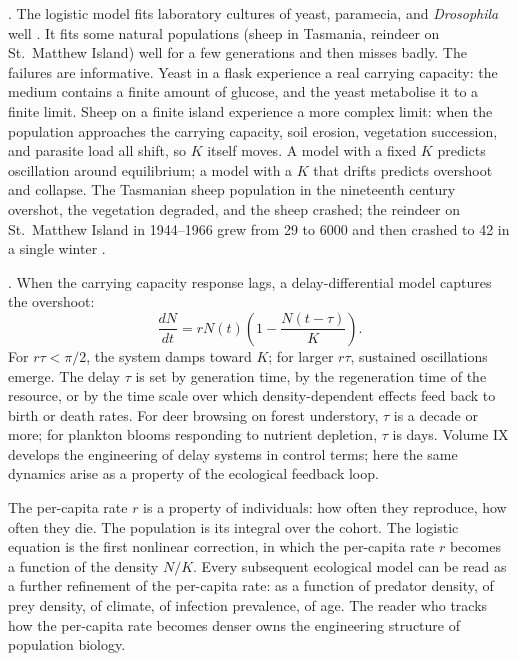 

. The logistic model fits
laboratory cultures of yeast, paramecia, and \emph{Drosophila} well
\cite[ch.~3]{text:v6c08-gotelli-ecology}. It fits some natural
populations (sheep in Tasmania, reindeer on St.\ Matthew Island) well
for a few generations and then misses badly. The failures are
informative. Yeast in a flask experience a real carrying capacity:
the medium contains a finite amount of glucose, and the yeast
metabolise it to a finite limit. Sheep on a finite island experience
a more complex limit: when the population approaches the carrying
capacity, soil erosion, vegetation succession, and parasite load all
shift, so $K$ itself moves. A model with a fixed $K$ predicts
oscillation around equilibrium; a model with a $K$ that drifts
predicts overshoot and collapse. The Tasmanian sheep population in
the nineteenth century overshot, the vegetation degraded, and the
sheep crashed; the reindeer on St.\ Matthew Island in 1944--1966 grew
from 29 to 6000 and then crashed to 42 in a single winter
\cite[pp.~350--367]{paper:v6c08-klein-1968-reindeer}.

. When the carrying capacity response
lags, a delay-differential model captures the overshoot:
\[
\frac{dN}{dt} = r N(t) \left(1 - \frac{N(t - \tau)}{K}\right).
\]
For $r \tau < \pi/2$, the system damps toward $K$; for larger
$r \tau$, sustained oscillations emerge. The delay $\tau$ is set by
generation time, by the regeneration time of the resource, or by the
time scale over which density-dependent effects feed back to birth or
death rates. For deer browsing on forest understory, $\tau$ is a
decade or more; for plankton blooms responding to nutrient depletion,
$\tau$ is days. Volume IX develops the engineering of delay systems
in control terms; here the same dynamics arise as a property of the
ecological feedback loop.

\begin{archetype}
The per-capita rate $r$ is a property of individuals: how often they
reproduce, how often they die. The population is its integral over
the cohort. The logistic equation is the first nonlinear
correction, in which the per-capita rate $r$ becomes a function of the
density $N/K$. Every subsequent ecological model can be read as a
further refinement of the per-capita rate: as a function of
predator density, of prey density, of climate, of infection
prevalence, of age. The reader who tracks how the per-capita rate
becomes denser owns the engineering structure of population biology.
\end{archetype}

